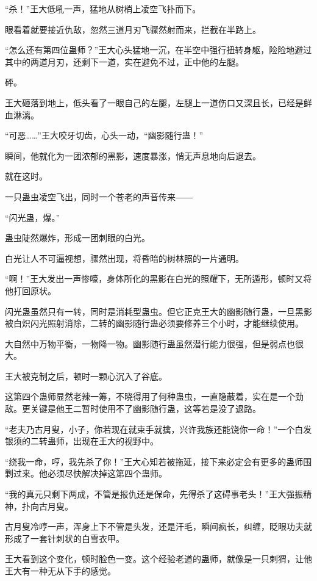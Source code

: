 
\begin{this_body}

“杀！”王大低吼一声，猛地从树梢上凌空飞扑而下。

眼看着就要接近仇敌，忽然三道月刃飞骤然射而来，拦截在半路上。

“怎么还有第四位蛊师？”王大心头猛地一沉，在半空中强行扭转身躯，险险地避过其中的两道月刃，还剩下一道，实在避免不过，正中他的左腿。

砰。

王大砸落到地上，低头看了一眼自己的左腿，左腿上一道伤口又深且长，已经是鲜血淋漓。

“可恶……”王大咬牙切齿，心头一动，“幽影随行蛊！”

瞬间，他就化为一团浓郁的黑影，速度暴涨，悄无声息地向后退去。

就在这时。

一只蛊虫凌空飞出，同时一个苍老的声音传来――

“闪光蛊，爆。”

蛊虫陡然爆炸，形成一团刺眼的白光。

白光让人不可逼视想，骤然出现，将昏暗的树林照的一片通明。

“啊！”王大发出一声惨嚎，身体所化的黑影在白光的照耀下，无所遁形，顿时又将他打回原状。

闪光蛊虽然只有一转，同时是消耗型蛊虫。但它正克王大的幽影随行蛊，一旦黑影被白炽闪光照射消除，二转的幽影随行蛊必须要修养三个小时，才能继续使用。

大自然中万物平衡，一物降一物。幽影随行蛊虽然潜行能力很强，但是弱点也很大。

王大被克制之后，顿时一颗心沉入了谷底。

这第四个蛊师显然老辣一筹，不晓得用了何种蛊虫，一直隐蔽着，实在是一个劲敌。更关键是他王二暂时使用不了幽影随行蛊，这等若是没了退路。

“老夫乃古月叟，小子，你若现在就束手就擒，兴许我族还能饶你一命！”一个白发银须的二转蛊师，出现在王大的视野中。

“绕我一命，哼，我先杀了你！”王大心知若被拖延，接下来必定会有更多的蛊师围剿过来。他必须尽快解决掉这第四个蛊师。

“我的真元只剩下两成，不管是报仇还是保命，先得杀了这碍事老头！”王大强振精神，扑向古月叟。

古月叟冷哼一声，浑身上下不管是头发，还是汗毛，瞬间疯长，纠缠，眨眼功夫就形成了一套针刺状的白雪衣甲。

王大看到这个变化，顿时脸色一变。这个经验老道的蛊师，就像是一只刺猬，让他王大有一种无从下手的感觉。


\end{this_body}
